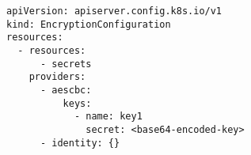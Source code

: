 \begin{verbatim}
apiVersion: apiserver.config.k8s.io/v1
kind: EncryptionConfiguration
resources:
  - resources:
      - secrets
    providers:
      - aescbc:
          keys:
            - name: key1
              secret: <base64-encoded-key>
      - identity: {}
\end{verbatim}
